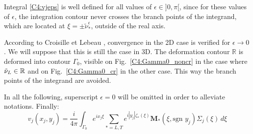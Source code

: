 Integral \eqref{C4:vjeps} is well defined for all values of $\epsilon \in \rbrack 0, \pi \lbrack $, since for these values of $\epsilon$, the integration contour never crosses the branch points of the integrand, which are located at $\xi=\pm \tilde{\nu}_*^{\epsilon}$, outside of the real axis.

According to Croisille et Lebeau \cite{CroisilleLebeau}, convergence in the 2D case is verified for $\epsilon \rightarrow 0$. We will suppose that this is still the case in 3D. The deformation contour $\mathbb{R}$ is deformed into contour $\Gamma_{0}$, visible on Fig.~\ref{C4:Gamma0_noncr} in the case where $\tilde{\nu}_L\in\mathbb{R}$ and on Fig.~\ref{C4:Gamma0_cr} in the other case. This way the branch points of the integrand are avoided.

In all the following, superscript $\epsilon=0$ will be omitted in order to alleviate notations. Finally:
\begin{equation}
v_j(x_j,y_j)=\frac{i}{4\pi}\int_{\Gamma_0} e^{ix_j\xi}\sum_{*=L,T}e^{i|y_j|\zeta_*(\xi)}\mathbf{M_*}(\xi,\mbox{sgn }y_j)\Sigma_j(\xi)\,d\xi
\label{C4:vj0}
\end{equation}

